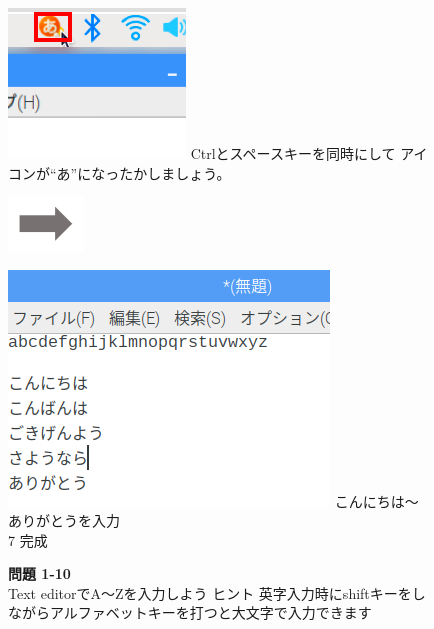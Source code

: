 \begin{figure}[ht]
  \begin{minipage}{0.4\textwidth}
    \includegraphics[width=\linewidth]{text01-img/textbook-img062.png}
     Ctrlとスペースキーを同時にして
    アイコンが“あ”になったかしましょう。
  \end{minipage}
  \includegraphics[width=2cm]{text01-img/textbook-img053.png}
  \begin{minipage}{0.4\textwidth}
    \includegraphics[width=\linewidth]{text01-img/textbook-img060.png}
     こんにちは〜ありがとうを入力\\
    7 完成
  \end{minipage}
  
  \flushleft
  \noindent \textbf{問題 1-10}\\
  Text editorでA〜Zを入力しよう
  \noindent ヒント 
  英字入力時にshiftキーをしながらアルファベットキーを打つと大文字で入力できます
\end{figure}



